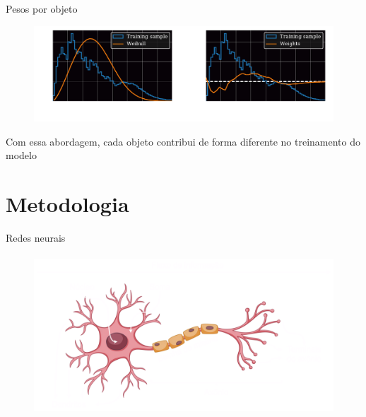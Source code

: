 \begin{frame}[c]{Pesos por objeto}
    \begin{figure}
        \centering
        \includegraphics[width=\linewidth]{script/images/weights_vs_specz.pdf}
    \end{figure}

    Com essa abordagem, cada objeto contribui de forma diferente no treinamento do modelo
\end{frame}

\section{Metodologia}
        

\begin{frame}[c]{Redes neurais}
    \begin{figure}
        \centering
        \includegraphics[height=6cm]{script/images/neuron_bio.png}
    \end{figure}
\end{frame}

